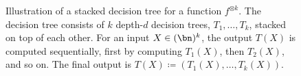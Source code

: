 \documentclass[11pt]{article}
\begin{document}
\begin{figure}[h!]
{
    }
  \captionsetup{width=.9\linewidth}

    \caption{Illustration of a stacked decision tree for a function $f^{\otimes k}$. The decision tree consists of $k$ depth-$d$ decision trees, $T_1,\ldots, T_k$, stacked on top of each other. For an input $X \in (\bn)^k$, the output $T(X)$ is computed sequentially, first by computing $T_1(X)$, then $T_2(X)$, and so on. The final output is $T(X)\coloneqq (T_1(X),\ldots, T_k(X))$. }
    \label{fig:stacked}
\end{figure}
\end{document}
